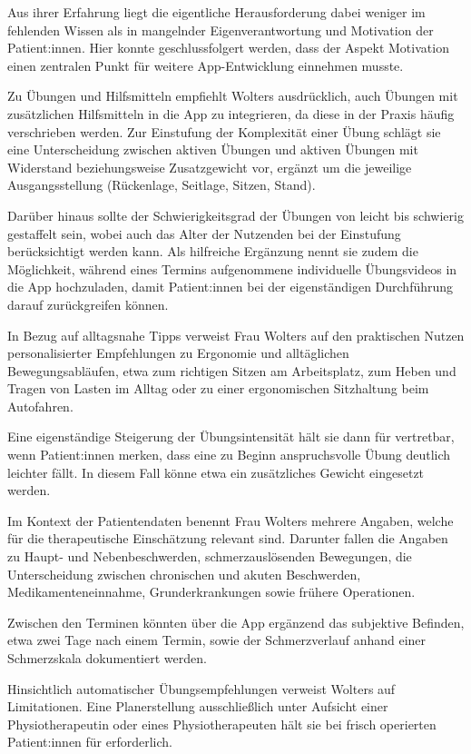 Aus ihrer Erfahrung liegt die eigentliche Herausforderung dabei weniger im fehlenden Wissen als in mangelnder Eigenverantwortung und Motivation der Patient:innen. Hier konnte geschlussfolgert werden, dass der Aspekt Motivation einen zentralen Punkt für weitere App-Entwicklung einnehmen musste.

Zu Übungen und Hilfsmitteln empfiehlt Wolters ausdrücklich, auch Übungen mit zusätzlichen Hilfsmitteln in die App zu integrieren, da diese in der Praxis häufig verschrieben werden. Zur Einstufung der Komplexität einer Übung schlägt sie eine Unterscheidung zwischen aktiven Übungen und aktiven Übungen mit Widerstand beziehungsweise Zusatzgewicht vor, ergänzt um die jeweilige Ausgangsstellung (Rückenlage, Seitlage, Sitzen, Stand).

Darüber hinaus sollte der Schwierigkeitsgrad der Übungen von leicht bis schwierig gestaffelt sein, wobei auch das Alter der Nutzenden bei der Einstufung berücksichtigt werden kann. Als hilfreiche Ergänzung nennt sie zudem die Möglichkeit, während eines Termins aufgenommene individuelle Übungsvideos in die App hochzuladen, damit Patient:innen bei der eigenständigen Durchführung darauf zurückgreifen können.

In Bezug auf alltagsnahe Tipps verweist Frau Wolters auf den praktischen Nutzen personalisierter Empfehlungen zu Ergonomie und alltäglichen Bewegungsabläufen, etwa zum richtigen Sitzen am Arbeitsplatz, zum Heben und Tragen von Lasten im Alltag oder zu einer ergonomischen Sitzhaltung beim Autofahren.

Eine eigenständige Steigerung der Übungsintensität hält sie dann für vertretbar, wenn Patient:innen merken, dass eine zu Beginn anspruchsvolle Übung deutlich leichter fällt. In diesem Fall könne etwa ein zusätzliches Gewicht eingesetzt werden.

Im Kontext der Patientendaten benennt Frau Wolters mehrere Angaben, welche für die therapeutische Einschätzung relevant sind. Darunter fallen die Angaben zu Haupt- und Nebenbeschwerden, schmerzauslösenden Bewegungen, die Unterscheidung zwischen chronischen und akuten Beschwerden, Medikamenteneinnahme, Grunderkrankungen sowie frühere Operationen.

Zwischen den Terminen könnten über die App ergänzend das subjektive Befinden, etwa zwei Tage nach einem Termin, sowie der Schmerzverlauf anhand einer Schmerzskala dokumentiert werden.

Hinsichtlich automatischer Übungsempfehlungen verweist Wolters auf Limitationen. Eine Planerstellung ausschließlich unter Aufsicht einer Physiotherapeutin oder eines Physiotherapeuten hält sie bei frisch operierten Patient:innen für erforderlich.

